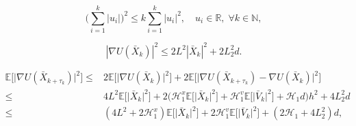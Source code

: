 \documentclass[10pt,a4paper]{amsart}
\renewcommand{\H}{\mathcal{H}}
\newcommand{\R}{\mathbb{R}}
\begin{document}
\begin{equation}
\label{eq:elementary_inequality}
\Big(
\sum_{i=1}^{k}|u_i|
\Big)^2 
\leq 
k
\sum_{i=1}^{k}|u_i|^2, 
\quad
u_i \in \R, \; 
\forall k \in \mathbb{N},
\end{equation}

\begin{equation}\label{eq:gradient-growth-square}
|\nabla U(\bar{X}_k)|^2
\leq
2L^2
|\bar{X}_k|^2
+
2L_2^2d.
\end{equation}

\begin{equation}
\label{eq:grad-Xtau-split-clear}
\begin{aligned}
\mathbb{E}
\Big[
\big|
\nabla U(\bar{X}_{k+\tau_k})
\big|^2
\Big]
\leq   &
2
\mathbb{E}
\Big[
\big|
\nabla U(\bar{X}_k)
\big|^2
\Big]
+
2\mathbb{E}
\Big[
\big|
\nabla U(\bar{X}_{k+\tau_k})
-
\nabla U(\bar{X}_k)
\big|^2
\Big]
\\   
\leq   &
4 L^2
\mathbb{E}
\Big[
\big|
\bar{X}_k
\big|^2
\Big]
+
2
\Big( 
\H^{x}_1
\mathbb{E}
\Big[\big|
\bar{X}_k
\big|^2\Big]
+
\H^{v}_1
\mathbb{E}
\Big[\big|
\bar{V}_k
\big|^2\Big]
+
\H_1
d
\Big)h^2
+
4 L_2^2  d
\\ 
\leq   &
(4 L^2
+
2\H^{x}_1)
\mathbb{E}
\Big[\big|
\bar{X}_k
\big|^2\Big]
+
2 
\H^{v}_1
\mathbb{E}
\Big[\big|
\bar{V}_k
\big|^2\Big]
+
( 
2\H_1  +  
4 L_2^2 
)
d,
\end{aligned}
\end{equation}
\end{document}
